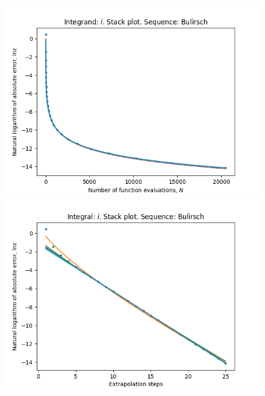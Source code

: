 \begin{figure}[H]
\centering
\begin{minipage}{0.45\textwidth}
\centering
\includegraphics[scale=0.45]{../results/romberg_plots/circle_area_hp_bulirsch_stack.png}
\end{minipage}
\begin{minipage}{0.45\textwidth}
\centering
\includegraphics[scale=0.45]{../results/romberg_plots/circle_area_hp_bulirsch_steps_stack.png}
\end{minipage}
\end{figure}

